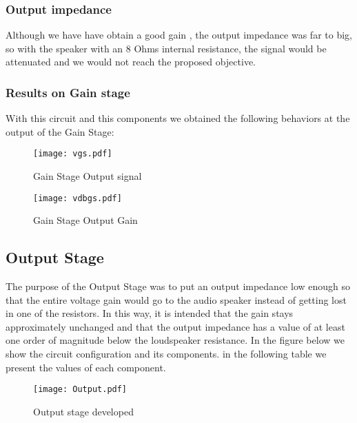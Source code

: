 \subsubsection{Output impedance}

Although we have have obtain a good gain , the output impedance was far to big, so with the speaker with an 8 Ohms internal resistance, the signal would be attenuated and we would not reach the proposed objective.  

\subsubsection{Results on Gain stage}


With this circuit and this components we obtained the following behaviors at the output of the Gain Stage:


\vspace{-0.9in}
\begin{figure}[H] \centering
\texttt{[image: vgs.pdf]}
\caption{Gain Stage Output signal}
\label{fig:gain1}
\end{figure}

\vspace{-0.9in}
\begin{figure}[H] \centering
\texttt{[image: vdbgs.pdf]}
\caption{Gain Stage Output Gain}
\label{fig:gain2}
\end{figure}


\subsection{Output Stage}



The purpose of the Output Stage was to put an output impedance low enough so that the entire voltage gain would go to the audio speaker instead of getting lost in one of the resistors. In this way, it is intended that the gain stays approximately unchanged and that the output impedance has a value of at least one order of magnitude below the loudspeaker resistance. In the figure below we show the circuit configuration and its components. in the following table we present the values of each component.



\begin{figure}[H] \centering
\texttt{[image: Output.pdf]}
\caption{Output stage developed}
\label{fig:dev1}
\end{figure}


